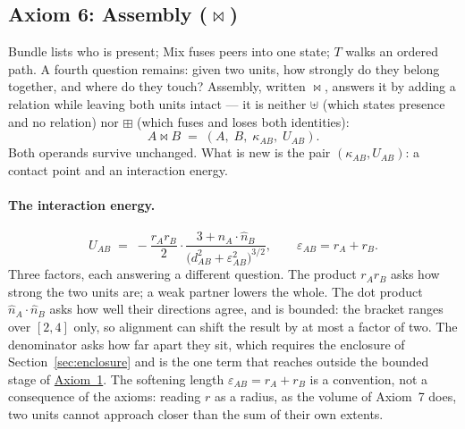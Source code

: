 \documentclass[12pt, a4paper]{article}
\begin{document}
\subsection{Axiom 6: Assembly (\texorpdfstring{$\bowtie$}{assembly})}
\label{subsec:axiom_assembly}
Bundle lists who is present; Mix fuses peers into one state; $T$
walks an ordered path. A fourth question remains: given two units,
how strongly do they belong together, and where do they touch?
Assembly, written $\bowtie$, answers it by adding a relation while
leaving both units intact --- it is neither $\uplus$ (which states
presence and no relation) nor $\boxplus$ (which fuses and loses both
identities):
\begin{equation}
    A \bowtie B \;=\; (A,\;B,\;\kappa_{AB},\;U_{AB}).
    \label{eq:assembly_signature}
\end{equation}
Both operands survive unchanged. What is new is the pair
$(\kappa_{AB}, U_{AB})$: a contact point and an interaction energy.

\paragraph{The interaction energy.}
\begin{equation}
    U_{AB} \;=\; -\frac{r_A r_B}{2}\cdot
    \frac{3+\hat n_A\cdot\hat n_B}
         {\bigl(d_{AB}^2+\varepsilon_{AB}^2\bigr)^{3/2}},
    \qquad
    \varepsilon_{AB} = r_A + r_B.
    \label{eq:assembly_energy}
\end{equation}
Three factors, each answering a different question. The product
$r_Ar_B$ asks how strong the two units are; a weak partner lowers the
whole. The dot product $\hat n_A\cdot\hat n_B$ asks how well their
directions agree, and is bounded: the bracket ranges over $[2,4]$
only, so alignment can shift the result by at most a factor of two.
The denominator asks how far apart they sit, which requires the
enclosure of Section~\ref{sec:enclosure} and is the one term that
reaches outside the bounded stage of \hyperref[subsec:axiom1]{Axiom~1}. The softening length $\varepsilon_{AB}=r_A+r_B$ is a convention, not a consequence of the axioms: reading $r$ as a radius, as the volume of Axiom~7 does, two units cannot approach closer than the sum of their own extents.
\end{document}
